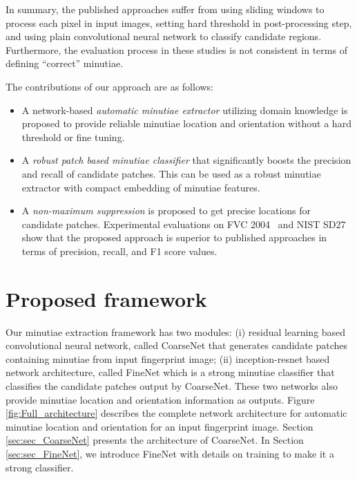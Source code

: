 \documentclass[10pt,twocolumn,letterpaper]{article}
\begin{document}
In summary, the published approaches suffer from using sliding windows to process each pixel in input images, setting hard threshold in post-processing step, and using plain convolutional neural network to classify candidate regions. Furthermore, the evaluation process in these studies is not consistent in terms of defining ``correct'' minutiae.

The contributions of our approach are as follows:
\vspace{-2mm}
\begin{itemize}
\item A network-based \emph{automatic minutiae extractor} utilizing domain knowledge is proposed to provide reliable minutiae location and orientation without a hard threshold or fine tuning.
\vspace{-1mm}
\item A \emph{robust patch based minutiae classifier} that significantly boosts the precision and recall of candidate patches. This can be used as a robust minutiae extractor with compact embedding of minutiae features.
\vspace{-1mm}
\item A \emph{non-maximum suppression} is proposed to get precise locations for candidate patches. Experimental evaluations on FVC 2004~\cite{maio2004fvc2004} and NIST SD27~\cite{garris2000nist} show that the proposed approach is superior to published approaches in terms of precision, recall, and F1 score values.
\end{itemize}


\section{Proposed framework}
\label{sec:sec_Proposed_framework}
Our minutiae extraction framework has two modules: (i) residual learning based convolutional neural network, called CoarseNet that generates candidate patches containing minutiae from input fingerprint image; (ii) inception-resnet based network architecture, called FineNet which is a strong minutiae classifier that classifies the candidate patches output by CoarseNet. These two networks also provide minutiae location and orientation information as outputs. Figure \ref{fig:Full_architecture} describes the complete network architecture for automatic minutiae location and orientation for an input fingerprint image. Section \ref{sec:sec_CoarseNet} presents the architecture of CoarseNet. In Section \ref{sec:sec_FineNet}, we introduce FineNet with details on training to make it a strong classifier.
\end{document}
